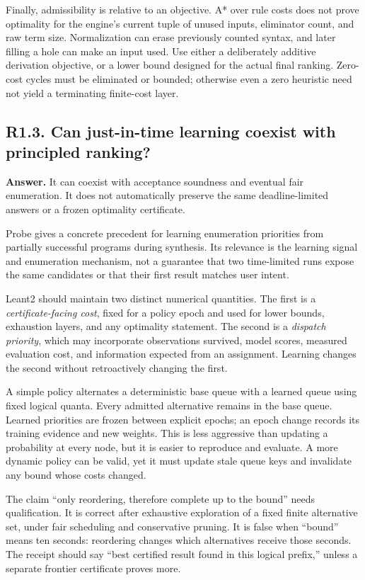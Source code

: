 \documentclass[11pt,a4paper]{article}
\newcommand{\question}[2]{\subsection{#1. #2}\label{q:#1}}
\theoremstyle{definition}
\theoremstyle{remark}
\begin{document}
Finally, admissibility is relative to an objective. A* over rule costs does not prove optimality for the engine's current tuple of unused inputs, eliminator count, and raw term size.\cite{repo-engine} Normalization can erase previously counted syntax, and later filling a hole can make an input used. Use either a deliberately additive derivation objective, or a lower bound designed for the actual final ranking. Zero-cost cycles must be eliminated or bounded; otherwise even a zero heuristic need not yield a terminating finite-cost layer.

\question{R1.3}{Can just-in-time learning coexist with principled ranking?}

\textbf{Answer.} It can coexist with acceptance soundness and eventual fair enumeration. It does not automatically preserve the same deadline-limited answers or a frozen optimality certificate.

Probe gives a concrete precedent for learning enumeration priorities from partially successful programs during synthesis.\cite{probe} Its relevance is the learning signal and enumeration mechanism, not a guarantee that two time-limited runs expose the same candidates or that their first result matches user intent.

Leant2 should maintain two distinct numerical quantities. The first is a \emph{certificate-facing cost}, fixed for a policy epoch and used for lower bounds, exhaustion layers, and any optimality statement. The second is a \emph{dispatch priority}, which may incorporate observations survived, model scores, measured evaluation cost, and information expected from an assignment. Learning changes the second without retroactively changing the first.

A simple policy alternates a deterministic base queue with a learned queue using fixed logical quanta. Every admitted alternative remains in the base queue. Learned priorities are frozen between explicit epochs; an epoch change records its training evidence and new weights. This is less aggressive than updating a probability at every node, but it is easier to reproduce and evaluate. A more dynamic policy can be valid, yet it must update stale queue keys and invalidate any bound whose costs changed.

The claim ``only reordering, therefore complete up to the bound'' needs qualification. It is correct after exhaustive exploration of a fixed finite alternative set, under fair scheduling and conservative pruning. It is false when ``bound'' means ten seconds: reordering changes which alternatives receive those seconds. The receipt should say ``best certified result found in this logical prefix,'' unless a separate frontier certificate proves more.
\end{document}
